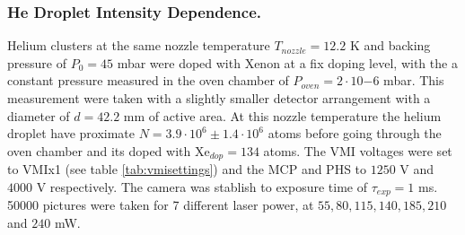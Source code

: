 \subsubsection{He Droplet  Intensity Dependence.}

Helium clusters at the same nozzle temperature $T_{nozzle}=12.2$ K and backing pressure of $P_{0}=45$ mbar were doped with Xenon at a fix doping level, with the a constant pressure measured in the oven chamber of $P_{oven}=2\cdot 10{-6}$ mbar. This measurement were taken with a slightly smaller detector arrangement with a diameter of $d=42.2$ mm of active area. At this nozzle temperature the helium droplet have proximate $N=3.9\cdot 10^{6}\pm 1.4\cdot 10^{6}$  atoms before going through the oven chamber and its doped with Xe$_{dop}=134$ atoms. The VMI voltages were set to VMIx1 (see table \ref{tab:vmisettings}) and the MCP and PHS to $1250$ V and $4000$ V respectively. The camera was stablish to exposure time of $\tau_{exp}=1$ ms. 50000 pictures were taken for 7 different laser power, at $55,80,115,140,185,210$ and $240$ mW. 


